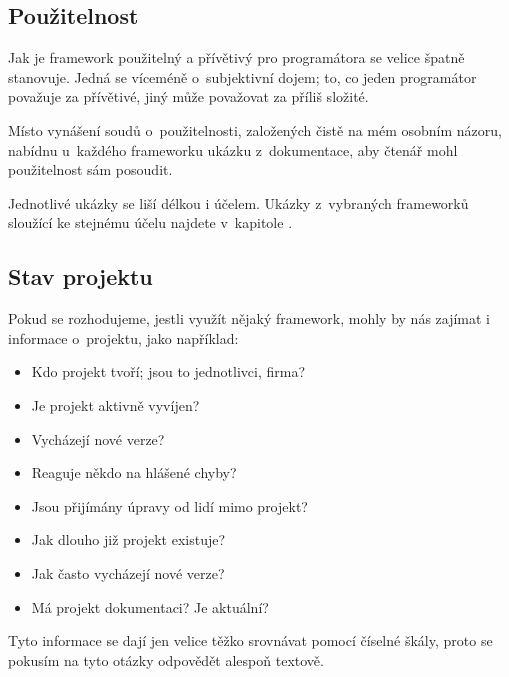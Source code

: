 \subsection{Použitelnost}\label{pouux17eitelnost}

Jak je framework použitelný a přívětivý pro programátora se velice špatně stanovuje. Jedná se víceméně o~subjektivní dojem; to, co jeden programátor považuje za přívětivé, jiný může považovat za příliš složité.

Místo vynášení soudů o~použitelnosti, založených čistě na mém osobním názoru, nabídnu u~každého frameworku ukázku z~dokumentace, aby čtenář mohl použitelnost sám posoudit.

Jednotlivé ukázky se liší délkou i účelem. Ukázky z~vybraných frameworků sloužící ke stejnému účelu najdete v~kapitole \emph{}.

\subsection{Stav projektu}\label{stav-projektu}

Pokud se rozhodujeme, jestli využít nějaký framework, mohly by nás zajímat i informace o~projektu, jako například:

\begin{itemize}
\tightlist
\item
  Kdo projekt tvoří; jsou to jednotlivci, firma?
\item
  Je projekt aktivně vyvíjen?
\item
  Vycházejí nové verze?
\item
  Reaguje někdo na hlášené chyby?
\item
  Jsou přijímány úpravy od lidí mimo projekt?
\item
  Jak dlouho již projekt existuje?
\item
  Jak často vycházejí nové verze?
\item
  Má projekt dokumentaci? Je aktuální?
\end{itemize}

Tyto informace se dají jen velice těžko srovnávat pomocí číselné škály, proto se pokusím na tyto otázky odpovědět alespoň textově.

                 

